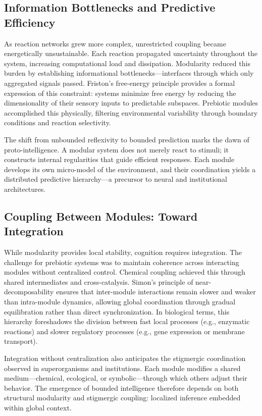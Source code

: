 \documentclass[11pt,a4paper]{article}
\begin{document}
\subsection{Information Bottlenecks and Predictive Efficiency}

As reaction networks grew more complex, unrestricted coupling became energetically unsustainable.  Each reaction propagated uncertainty throughout the system, increasing computational load and dissipation.  Modularity reduced this burden by establishing informational bottlenecks—interfaces through which only aggregated signals passed.  Friston’s free-energy principle \citep{Friston2010FreeEnergyPrinciple} provides a formal expression of this constraint: systems minimize free energy by reducing the dimensionality of their sensory inputs to predictable subspaces.  Prebiotic modules accomplished this physically, filtering environmental variability through boundary conditions and reaction selectivity.

The shift from unbounded reflexivity to bounded prediction marks the dawn of proto-intelligence.  A modular system does not merely react to stimuli; it constructs internal regularities that guide efficient responses.  Each module develops its own micro-model of the environment, and their coordination yields a distributed predictive hierarchy—a precursor to neural and institutional architectures.

\subsection{Coupling Between Modules: Toward Integration}

While modularity provides local stability, cognition requires integration.  The challenge for prebiotic systems was to maintain coherence across interacting modules without centralized control.  Chemical coupling achieved this through shared intermediates and cross-catalysis.  Simon’s principle of near-decomposability ensures that inter-module interactions remain slower and weaker than intra-module dynamics, allowing global coordination through gradual equilibration rather than direct synchronization.  In biological terms, this hierarchy foreshadows the division between fast local processes (e.g., enzymatic reactions) and slower regulatory processes (e.g., gene expression or membrane transport).

Integration without centralization also anticipates the stigmergic coordination observed in superorganisms and institutions.  Each module modifies a shared medium—chemical, ecological, or symbolic—through which others adjust their behavior.  The emergence of bounded intelligence therefore depends on both structural modularity and stigmergic coupling: localized inference embedded within global context.
\end{document}
